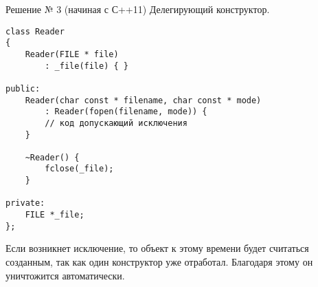 \begin{itemize}
Решение № 3 (начиная с С++11)
Делегирующий конструктор.
\begin{verbatim}
class Reader
{
    Reader(FILE * file)
        : _file(file) { }

public:
    Reader(char const * filename, char const * mode)
        : Reader(fopen(filename, mode)) {
        // код допускающий исключения
    }

    ~Reader() {
        fclose(_file);
    }

private:
    FILE *_file;
};
\end{verbatim}
Если возникнет исключение, то объект к этому времени будет считаться созданным, так как один конструктор уже отработал. Благодаря этому он уничтожится автоматически.
\end{itemize}
